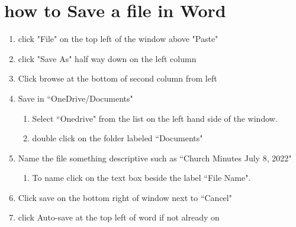 \documentclass[12pt,letterpaper]{article}
\begin{document}
\section{how to Save a file in Word}
\begin{enumerate}
\item click "File" on the top left of the window above "Paste"
\item click "Save As" half way down on the left column 
\item Click browse at the bottom of second column from left
\item Save in ``OneDrive/Documents"
    \begin{enumerate}
        \item Select ``Onedrive" from the list on the left hand side of the window.
        \item double click on the folder labeled ``Documents"
    \end{enumerate}
\item Name the file something descriptive such as ``Church Minutes July 8, 2022"
    \begin{enumerate}
       \item To name click on the text box beside the label ``File Name".
    \end{enumerate}
\item Click save on the bottom right of window next to ``Cancel" 
\item click Auto-save at the top left of word if not already on
\end{enumerate}
\end{document}
